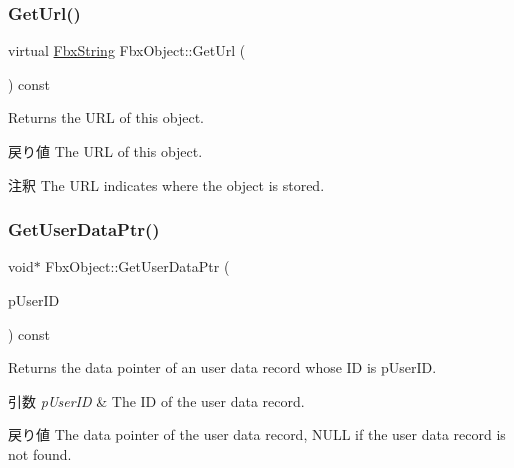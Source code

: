 \subsubsection{\texorpdfstring{Get\+Url()}{GetUrl()}}
{\footnotesize\ttfamily virtual \hyperlink{class_fbx_string}{Fbx\+String} Fbx\+Object\+::\+Get\+Url (\begin{DoxyParamCaption}{ }\end{DoxyParamCaption}) const\hspace{0.3cm}{\ttfamily [virtual]}}

Returns the U\+RL of this object. \begin{DoxyReturn}{戻り値}
The U\+RL of this object. 
\end{DoxyReturn}
\begin{DoxyRemark}{注釈}
The U\+RL indicates where the object is stored. 
\end{DoxyRemark}
\mbox{\label{class_fbx_object_a434f9f31f49ddea0ce7248a75bbed30a}} 
\subsubsection{\texorpdfstring{Get\+User\+Data\+Ptr()}{GetUserDataPtr()}\hspace{0.1cm}{\footnotesize\ttfamily [1/2]}}
{\footnotesize\ttfamily void$\ast$ Fbx\+Object\+::\+Get\+User\+Data\+Ptr (\begin{DoxyParamCaption}\item[{const \hyperlink{fbxtypes_8h_a9beeca85cdc9941e912fe9eac7709b53}{Fbx\+U\+Int64} \&}]{p\+User\+ID }\end{DoxyParamCaption}) const}

Returns the data pointer of an user data record whose ID is p\+User\+ID. 
\begin{DoxyParams}{引数}
{\em p\+User\+ID} & The ID of the user data record. \\
\hline
\end{DoxyParams}
\begin{DoxyReturn}{戻り値}
The data pointer of the user data record, {\ttfamily N\+U\+LL} if the user data record is not found. 
\end{DoxyReturn}
\mbox{\label{class_fbx_object_ae1580cc0f041cf81bf0a3a96c4e00554}} 
